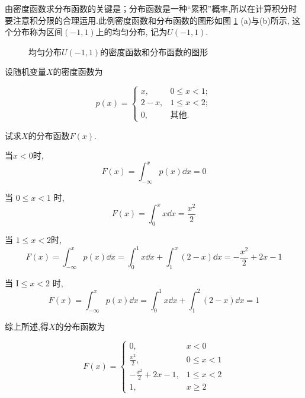 由密度函数求分布函数的关键是；分布函数是一种“累积”概率,所以在计算积分时要注意积分限的合理运用.此例密度函数和分布函数的图形如图 \ref{fig:2-1-6} (a)与(b)所示, 这个分布称为区间$(-1,1)$上的均匀分布, 记为$U(-1,1)$.

\begin{figure}[!ht]
  \centering
{}\hspace{2cm}
\caption{均匀分布$U(-1,1)$的密度函数和分布函数的图形}\label{fig:2-1-6}
\end{figure}

\begin{example}
	设随机变量$X$的密度函数为
	
	\[
	  p(x) = \begin{cases}
        x, & 0 \leqslant x<1; \\
        2 - x, & 1 \leqslant x<2; \\
        0, & \text{其他}.
      \end{cases}
	\]
	
	试求$ X $的分布函数$ F(x) $.
	\end{example}
	\begin{solution}
     当$ x<0 $时,
	\[
	F(x)=\int_{-\infty}^{x} p(x) \dd  x=0
	\]
	
	当 $0 \leqslant x<1$ 时,
	\[
	F(x)=\int_{0}^{x} x \dd  x=\frac{x^{2}}{2}
	\]
	
	当 $1 \leqslant x<2$时,
	\[
	F(x)=\int_{-\infty}^{x} p(x) \dd  x=\int_{0}^{1} x \dd  x+\int_{1}^{x}(2-x) \dd  x=-\frac{x^{2}}{2}+2 x-1
	\]
	
	当 $\mathrm{I} \leqslant x<2$ 时,
	\[
	F(x)=\int_{-\infty}^{x} p(x) \dd  x=\int_{0}^{1} x \dd  x+\int_{1}^{2}(2-x) \dd  x=1
	\]
	
	综上所述,得$ X $的分布函数为
	
	\[
	F(x)=\left\{\begin{array}{ll}
	{0,} & {x<0} \\
	{\frac{x^{2}}{2},} & {0 \leqslant x<1} \\
	{-\frac{x^{2}}{2}+2 x-1,} & {1 \leqslant x<2} \\
	{1,} & {x \geqslant 2}
	\end{array}\right.
	\]
   \end{solution}


